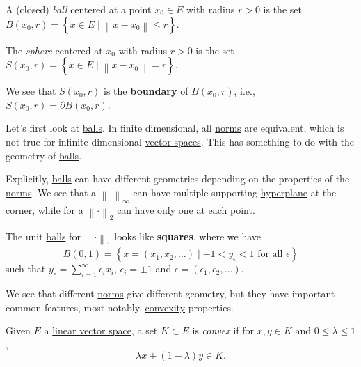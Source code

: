 \begin{definition}[Ball]\label{def:ball}
	A (closed) \emph{ball} centered at a point \(x_0\in E\) with radius \(r>0\) is the set \(B(x_0, r) = \left\{ x\in E\mid \left\lVert x - x_0\right\rVert \leq r \right\} \).
\end{definition}

\begin{definition}[Sphere]\label{def:sphere}
	The \emph{sphere} centered at \(x_0\) with radius \(r>0\) is the set \(S(x_0, r) = \left\{ x\in E\mid \left\lVert x - x_0\right\rVert = r\right\} \).
\end{definition}

\begin{note}
	We see that \(S(x_0, r)\) is the \textbf{boundary} of \(B(x_0, r)\), i.e., \(S(x_0, r) = \partial B(x_0, r)\).
\end{note}

Let's first look at \hyperref[def:ball]{balls}. In finite dimensional, all \hyperref[def:norm]{norms} are equivalent, which is not true for infinite dimensional \hyperref[def:normed-vector-space]{vector spaces}. This has something to do with the geometry of \hyperref[def:ball]{balls}.

Explicitly, \hyperref[def:ball]{balls} can have different geometries depending on the properties of the \hyperref[def:norm]{norms}. We see that a \(\left\lVert \cdot\right\rVert _{\infty}\) can have multiple supporting \hyperref[def:hyperplane]{hyperplane} at the corner, while for a \(\left\lVert \cdot\right\rVert _2\) can have only one at each point.
\begin{remark}
	The unit \hyperref[def:ball]{balls} for \(\left\lVert \cdot\right\rVert _1\) looks like \textbf{squares}, where we have
	\[
		B(0, 1) = \left\{ x = (x_1, x_2, \ldots)\mid -1 < y_{\epsilon } < 1 \text{ for all } \epsilon\right\}
	\]
	such that \(y_{\epsilon } = \sum_{i=1}^{\infty} \epsilon _i x_i \), \(\epsilon _i = \pm 1\) and \(\epsilon = (\epsilon _1, \epsilon _2, \ldots  )\).
\end{remark}

We see that different \hyperref[def:norm]{norms} give different geometry, but they have important common features, most notably, \hyperref[def:convex-function]{convexity} properties.

\begin{definition}\label{def:convex-set}
	Given \(E\) a \hyperref[def:linear-vector-space]{linear vector space}, a set \(K\subset E\) is \emph{convex} if for \(x, y\in K\) and \(0 \leq \lambda \leq 1\),
	\[
		\lambda x + (1 - \lambda )y\in K.
	\]
\end{definition}

